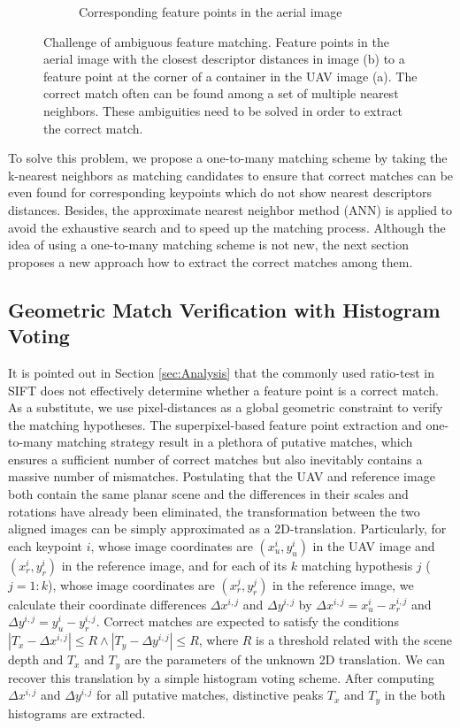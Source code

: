 \begin{figure}[tbp]
\begin{subfigure}[b]{0.4\columnwidth}
           \caption{Corresponding feature points in the aerial image}%
           {{\small }}
           \label{fig:ontomany_b}
       \end{subfigure}
       \caption{Challenge of ambiguous feature matching. Feature points in the aerial image with the closest descriptor distances in image (b) to a feature point at the corner of a container in the UAV image (a). The correct match often can be found among a set of multiple nearest neighbors. These ambiguities need to be solved in order to extract the correct match.}
       \label{fig:onetomany}
\end{figure}
To solve this problem, we propose a one-to-many matching scheme by taking the k-nearest neighbors as matching candidates to ensure that correct matches can be even found for corresponding keypoints which do not show nearest descriptors distances. 
Besides, the approximate nearest neighbor method (ANN) is applied to avoid the exhaustive search and to speed up the matching process.
Although the idea of using a one-to-many matching scheme is not new, the next section proposes a new approach how to extract the correct matches among them. 

\subsection{Geometric Match Verification with Histogram Voting}
\label{sec:Filt}
It is pointed out in Section \ref{sec:Analysis} that the commonly used ratio-test in SIFT does not effectively determine whether a feature point is a correct match. 
As a substitute, we use pixel-distances as a global geometric constraint to verify the matching hypotheses. 
The superpixel-based feature point extraction and one-to-many matching strategy result in a plethora of putative matches, which ensures a sufficient number of correct matches but also inevitably contains a massive number of mismatches.
Postulating that the UAV and reference image both contain the same planar scene and the differences in their scales and rotations have already been eliminated, the transformation between the two aligned images can be simply approximated as a 2D-translation. 
Particularly, for each keypoint $i$, whose image coordinates are $(x_{u}^i, y_{u}^i)$ in the UAV image and $(x_{r}^i, y_{r}^i)$ in the reference image, and for each of its $k$ matching hypothesis $j$ ($j=1:k$), whose image coordinates are $(x_{r}^j, y_{r}^j)$ in the reference image, we calculate their coordinate differences $\Delta x^{i,j}$ and $\Delta y^{i,j}$ by $\Delta x^{i,j} = x_{u}^i - x_{r}^{i,j} $ and $ \Delta y^{i,j} = y_{u}^i - y_{r}^{i,j} $.
Correct matches are expected to satisfy the conditions $ | T_x - \Delta x^{i,j} | \le R \wedge | T_y - \Delta y^{i,j} | \le R $, where $R$ is a threshold related with the scene depth and $T_x$ and $T_y$ are the parameters of the unknown 2D translation. 
We can recover this translation by a simple histogram voting scheme. 
After computing $\Delta x^{i,j}$ and $\Delta y^{i,j}$ for all putative matches, distinctive peaks $T_x$ and $T_y$ in the both histograms are extracted.

